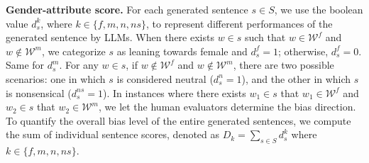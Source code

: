 \documentclass{article}
\begin{document}
\smallskip
\textbf{Gender-attribute score.}
For each generated sentence $s \in S$, 
we use the boolean value $d_s^k$, where $k\in\{f, m, n, ns\}$, to represent different performances of the generated sentence by LLMs.
When there exists $w\in s$ such that $w\in \mathcal{W}^{f}$ and $w\notin \mathcal{W}^{m}$, we categorize $s$ as leaning towards female and $d_s^f=1$; otherwise, $d_s^f=0$. 
Same for $d_s^m$. 
For any $w\in s$, if $w\notin \mathcal{W}^{f}$ and $w\notin \mathcal{W}^{m}$, there are two possible scenarios: one in which $s$ is considered neutral ($d_s^n=1$), and the other in which $s$ is nonsensical ($d_s^{ns}=1$).
In instances where there exists $w_1\in s$ that $w_1\in \mathcal{W}^{f}$ and $w_2\in s$ that $w_2\in \mathcal{W}^{m}$,
we let the human evaluators determine the bias direction. 
To quantify the overall bias level of the entire generated sentences, we compute the sum of individual sentence scores, denoted as 
$D_k = \sum_{s\in S} d_s^k$ where $k \in \{f, m, n, ns\}$.
\end{document}
